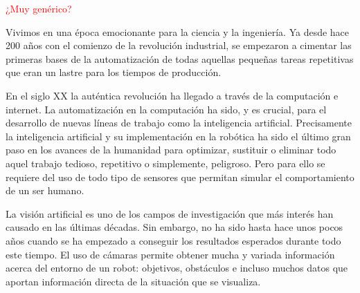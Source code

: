 

\textcolor{red}{¿Muy genérico?}

Vivimos en una época emocionante para la ciencia y la ingeniería. Ya desde hace
200 años con el comienzo de la revolución industrial, se empezaron a cimentar
las primeras bases de la automatización de todas aquellas pequeñas tareas
repetitivas que eran un lastre para los tiempos de producción.

En el siglo XX la auténtica revolución ha llegado a través de la computación e
internet. La automatización en la computación ha sido, y es crucial, para el
desarrollo de nuevas líneas de trabajo como la inteligencia artificial.
Precisamente la inteligencia artificial y su implementación en la robótica ha
sido el último gran paso en los avances de la humanidad para optimizar,
sustituir o eliminar todo aquel trabajo tedioso, repetitivo o simplemente,
peligroso. Pero para ello se requiere del uso de todo tipo de sensores que
permitan simular el comportamiento de un ser humano.

La visión artificial es uno de los campos de investigación que más interés han
causado en las últimas décadas. Sin embargo, no ha sido hasta hace unos pocos
años cuando se ha empezado a conseguir los resultados esperados durante todo
este tiempo. El uso de cámaras permite obtener mucha y variada información
acerca del entorno de un robot: objetivos, obstáculos e incluso muchos datos que
aportan información directa de la situación que se visualiza.

